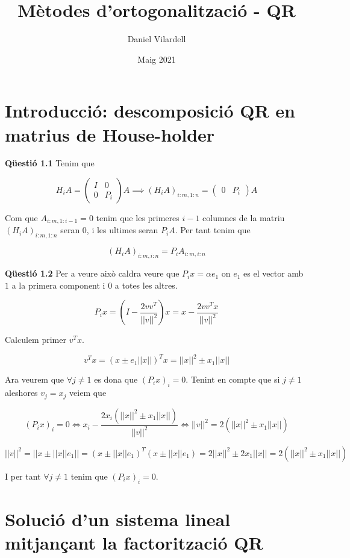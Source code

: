\documentclass[12pt, a4papre]{article}
\author{Daniel Vilardell}
\title{Mètodes d’ortogonalització - QR}
\date{Maig 2021}
\begin{document}
	\maketitle

	\section{Introducció: descomposició QR en matrius de House-holder}
	
	\textbf{Qüestió 1.1} Tenim que 
	
	\[
		H_iA = 
		\begin{pmatrix}
			I & 0\\
			0& P_i
		\end{pmatrix} 
		A \implies 
		(H_iA)_{i:m, 1:n} =
		\begin{pmatrix}
			0& P_i
		\end{pmatrix} 
		A 
	\]
	
	Com que $A_{i:m, 1:i-1} = 0$ tenim que les primeres $i-1$ columnes de la matriu $(H_iA)_{i:m, 1:n}$ seran $0$, i les ultimes seran $P_iA$. Per tant tenim que
	
	\[
		(H_iA)_{i:m, i:n} = P_iA_{i:m, i:n}
	\]
	
	\textbf{Qüestió 1.2} Per a veure això caldra veure que $P_ix = \alpha e_1$ on $e_1$ es el vector amb $1$ a la primera component i $0$ a totes les altres.
	
	\[
		P_ix = (I-\frac{2vv^T}{||v||^2})x = x-\frac{2vv^Tx}{||v||^2}
	\]
	
	Calculem primer $v^Tx$.
	
	\[
		v^Tx = (x \pm e_1||x||)^Tx = ||x||^2 \pm x_1||x||
	\]
	
	Ara veurem que $\forall j \neq 1$ es dona que $(P_ix)_i = 0$. Tenint en compte que si $j \neq 1$ aleshores $v_j = x_j$ veiem que
	
	\[
		(P_ix)_i = 0 \iff x_i-\frac{2x_i(||x||^2 \pm x_1||x||)}{||v||^2} \iff ||v||^2 = 2(||x||^2 \pm x_1||x||)
	\]
	
	\[
		||v||^2 = ||x \pm  ||x|| e_1|| = (x \pm  ||x|| e_1)^T(x \pm  ||x|| e_1) = 2||x||^2\pm 2x_1||x|| =  2(||x||^2 \pm x_1||x||)
	\]
	
	I per tant $\forall j \neq 1$ tenim que $(P_ix)_i = 0$.
	
	\section{Solució d’un sistema lineal mitjançant la factorització QR}
	
\end{document}
